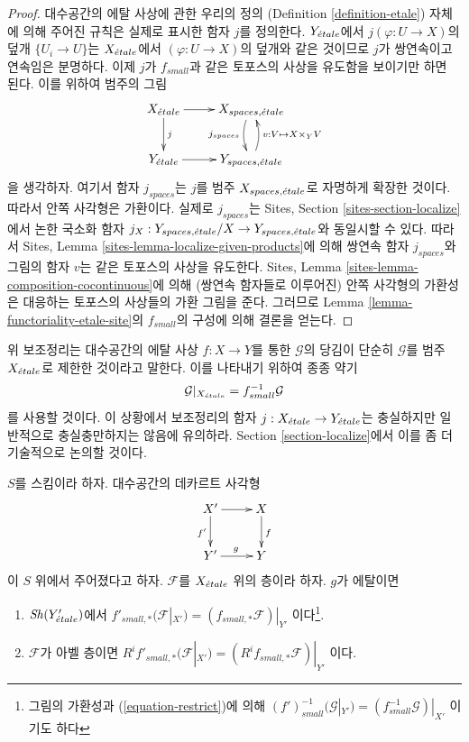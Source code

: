 \begin{proof}
대수공간의 에탈 사상에 관한 우리의 정의
(Definition \ref{definition-etale}) 자체에 의해 주어진 규칙은 실제로
표시한 함자 $j$를 정의한다. $Y_{\acute{e}tale}$에서
$j(\varphi : U \to X)$의 덮개 $\{U_i \to U\}$는
$X_{\acute{e}tale}$에서 $(\varphi : U \to X)$의 덮개와 같은 것이므로
$j$가 쌍연속이고 연속임은 분명하다. 이제 $j$가 $f_{small}$과 같은
토포스의 사상을 유도함을 보이기만 하면 된다. 이를 위하여 범주의 그림
$$
\xymatrix{
X_\etale \ar[r] \ar[d]^j &
X_{spaces, \etale} \ar@/_/[d]_{j_{spaces}} \\
Y_\etale \ar[r] &
Y_{spaces, \etale} \ar@/_/[u]_{v : V \mapsto X \times_Y V}
}
$$
을 생각하자. 여기서 함자 $j_{spaces}$는 $j$를 범주
$X_{spaces, {\acute{e}tale}}$로 자명하게 확장한 것이다. 따라서 안쪽
사각형은 가환이다. 실제로 $j_{spaces}$는 Sites, Section
\ref{sites-section-localize}에서 논한 국소화 함자
$j_X : Y_{spaces, {\acute{e}tale}}/X \to Y_{spaces, {\acute{e}tale}}$와 동일시할 수 있다.
따라서 Sites, Lemma \ref{sites-lemma-localize-given-products}에 의해
쌍연속 함자 $j_{spaces}$와 그림의 함자 $v$는 같은 토포스의
사상을 유도한다. Sites, Lemma
\ref{sites-lemma-composition-cocontinuous}에 의해 (쌍연속 함자들로
이루어진) 안쪽 사각형의 가환성은 대응하는 토포스의 사상들의
가환 그림을 준다. 그러므로 Lemma
\ref{lemma-functoriality-etale-site}의 $f_{small}$의 구성에 의해
결론을 얻는다.
\end{proof}

\noindent
위 보조정리는 대수공간의 에탈 사상 $f : X \to Y$를 통한
$\mathcal{G}$의 당김이 단순히 $\mathcal{G}$를 범주 $X_{\acute{e}tale}$로
제한한 것이라고 말한다. 이를 나타내기 위하여 종종 약기
\begin{equation}
\label{equation-restrict}
\mathcal{G}|_{X_{\acute{e}tale}} = f_{small}^{-1}\mathcal{G}
\end{equation}
를 사용할 것이다. 이 상황에서 보조정리의 함자
$j : X_{\acute{e}tale} \to Y_{\acute{e}tale}$는 충실하지만 일반적으로 충실충만하지는
않음에 유의하라. Section \ref{section-localize}에서 이를 좀 더
기술적으로 논의할 것이다.

\begin{lemma}
\label{lemma-pushforward-etale-base-change}
$S$를 스킴이라 하자. 대수공간의 데카르트 사각형
$$
\xymatrix{
X' \ar[r] \ar[d]_{f'} & X \ar[d]^f \\
Y' \ar[r]^g & Y
}
$$
이 $S$ 위에서 주어졌다고 하자.
$\mathcal{F}$를 $X_{\acute{e}tale}$ 위의 층이라 하자. $g$가 에탈이면
\begin{enumerate}
\item $\mathop{\mathit{Sh}}\nolimits(Y'_{\acute{e}tale})$에서
$f'_{small, *}(\mathcal{F}|_{X'}) = (f_{small, *}\mathcal{F})|_{Y'}$
이다\footnote{그림의 가환성과 (\ref{equation-restrict})에 의해
$(f')_{small}^{-1}(\mathcal{G}|_{Y'}) = (f_{small}^{-1}\mathcal{G})|_{X'}$
이기도 하다}.
\item $\mathcal{F}$가 아벨 층이면
$R^if'_{small, *}(\mathcal{F}|_{X'}) = (R^if_{small, *}\mathcal{F})|_{Y'}$
이다.
\end{enumerate}
\end{lemma}

